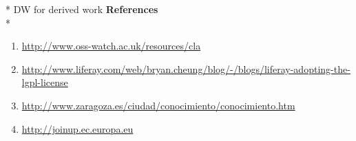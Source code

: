 \documentclass[11pt]{article} %
\begin{document}
\centerline \small {* DW for derived work}
\newpage 
{\bf References}\\*
	\begin {enumerate}
	\item \url {http://www.oss-watch.ac.uk/resources/cla}
	\item \url {http://www.liferay.com/web/bryan.cheung/blog/-/blogs/liferay-adopting-the-lgpl-license}
	\item \url {http://www.zaragoza.es/ciudad/conocimiento/conocimiento.htm}
	\item\url {http://joinup.ec.europa.eu}
	\end {enumerate}
\newpage

\tableofcontents
\end{document}
